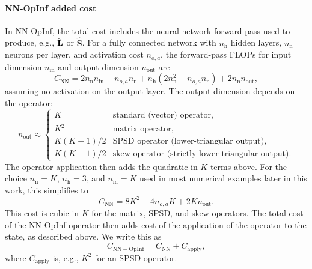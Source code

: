 \documentclass[3p,computermodern,11pt]{elsarticle}
\numberwithin{equation}{section}
\newcommand{\nHidden}{n_{\mathrm{h}}}
\newcommand{\nNeurons}{n_{\mathrm{n}}}
\newcommand{\nOpsActivation}{n_{o,a}}
\newcommand{\romDim}{K}
\begin{document}
\paragraph{NN-OpInf added cost}
In NN-OpInf, the total cost includes the neural-network forward pass used to produce, e.g., $\skew{-4}\hat{\mathbf{L}}$ or $\hat{\mathbf{S}}$. For a fully connected network with $\nHidden$ hidden layers, $\nNeurons$ neurons per layer, and activation cost $\nOpsActivation$, the forward-pass FLOPs for input dimension $n_{\mathrm{in}}$ and output dimension $n_{\mathrm{out}}$ are
$$
C_{\mathrm{NN}} = 2 \nNeurons n_{\mathrm{in}} + \nOpsActivation \nNeurons + \nHidden \left(2 \nNeurons^2 + \nOpsActivation \nNeurons \right) + 2 \nNeurons n_{\mathrm{out}},
$$
assuming no activation on the output layer. The output dimension depends on the operator:
$$
n_{\mathrm{out}} \approx
\begin{cases}
\romDim & \text{standard (vector) operator},\\
\romDim^2 & \text{matrix operator},\\
\romDim(\romDim+1)/2 & \text{SPSD operator (lower-triangular output)},\\
\romDim(\romDim-1)/2 & \text{skew operator (strictly lower-triangular output)}.
\end{cases}
$$
The operator application then adds the quadratic-in-$\romDim$ terms above.
For the choice $\nNeurons=\romDim$, $\nHidden=3$, and $n_{\mathrm{in}}=\romDim$ used in most numerical examples later in this work, this simplifies to
$$
C_{\mathrm{NN}} = 8\romDim^2 + 4\nOpsActivation \romDim + 2\romDim n_{\mathrm{out}}.
$$
This cost is cubic in $K$ for the matrix, SPSD, and skew operators. The total cost of the NN OpInf operator then adds cost of the application of the operator to the state, as described above. We write this as
$$
C_{\mathrm{NN-OpInf}} = C_{\mathrm{NN}} + C_{\mathrm{apply}}, 
$$
where $C_{\mathrm{apply}}$ is, e.g., $K^2$ for an SPSD operator.
\end{document}
